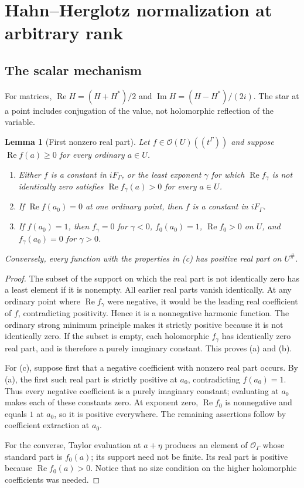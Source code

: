 \documentclass[11pt,letterpaper]{article}
\newtheorem{lemma}[theorem]{Lemma}
\theoremstyle{definition}
\newcommand{\FG}{F_\Gamma}\newcommand{\KG}{K_\Gamma}
\newcommand{\OU}[1]{\mathcal O(#1)((t^\Gamma))}
\newcommand{\Rea}{\operatorname{Re}}
\newcommand{\Ima}{\operatorname{Im}}
\newcommand{\halo}[1]{#1^{\#}}
\numberwithin{equation}{section}
\begin{document}
\section{Hahn--Herglotz normalization at arbitrary rank}
\label{herg:sec:normalization}

\subsection{The scalar mechanism}

For matrices, $\Rea H=(H+H^*)/2$ and $\Ima H=(H-H^*)/(2i)$. The star at a point includes conjugation of the value, not holomorphic reflection of the variable.

\begin{lemma}[First nonzero real part]\label{herg:lem:scalar}
Let $f\in\OU{U}$ and suppose $\Rea f(a)\ge0$ for every ordinary $a\in U$.
\begin{enumerate}[label=(\alph*)]
\item Either $f$ is a constant in $i\FG$, or the least exponent $\gamma$ for which $\Rea f_\gamma$ is not identically zero satisfies $\Rea f_\gamma(a)>0$ for every $a\in U$.
\item If $\Rea f(a_0)=0$ at one ordinary point, then $f$ is a constant in $i\FG$.
\item If $f(a_0)=1$, then $f_\gamma=0$ for $\gamma<0$, $f_0(a_0)=1$, $\Rea f_0>0$ on $U$, and $f_\gamma(a_0)=0$ for $\gamma>0$.
\end{enumerate}
Conversely, every function with the properties in (c) has positive real part on $\halo U$.
\end{lemma}
\begin{proof}
The subset of the support on which the real part is not identically zero has a least element if it is nonempty. All earlier real parts vanish identically. At any ordinary point where $\Rea f_\gamma$ were negative, it would be the leading real coefficient of $f$, contradicting positivity. Hence it is a nonnegative harmonic function. The ordinary strong minimum principle makes it strictly positive because it is not identically zero. If the subset is empty, each holomorphic $f_\gamma$ has identically zero real part, and is therefore a purely imaginary constant. This proves (a) and (b).

For (c), suppose first that a negative coefficient with nonzero real part occurs. By (a), the first such real part is strictly positive at $a_0$, contradicting $f(a_0)=1$. Thus every negative coefficient is a purely imaginary constant; evaluating at $a_0$ makes each of these constants zero. At exponent zero, $\Rea f_0$ is nonnegative and equals $1$ at $a_0$, so it is positive everywhere. The remaining assertions follow by coefficient extraction at $a_0$.

For the converse, Taylor evaluation at $a+\eta$ produces an element of $\mathcal O_\Gamma$ whose standard part is $f_0(a)$; its support need not be finite. Its real part is positive because $\Rea f_0(a)>0$. Notice that no size condition on the higher holomorphic coefficients was needed.
\end{proof}
\end{document}
